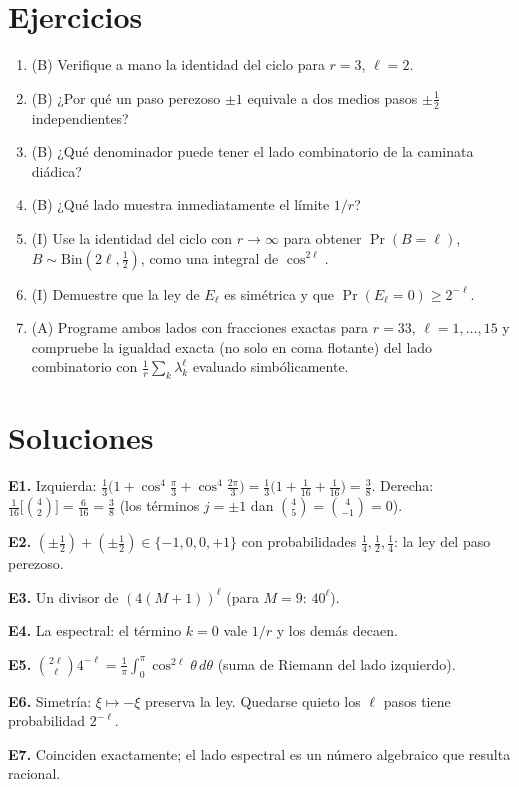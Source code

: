 \documentclass[11pt,a4paper]{article}
\begin{document}
\section{Ejercicios}
\begin{enumerate}[label=\textbf{E\arabic*.}]
\item (B) Verifique a mano la identidad del ciclo para $r=3$, $\ell=2$.
\item (B) ¿Por qué un paso perezoso $\pm1$ equivale a dos medios pasos $\pm\frac12$ independientes?
\item (B) ¿Qué denominador puede tener el lado combinatorio de la caminata diádica?
\item (B) ¿Qué lado muestra inmediatamente el límite $1/r$?
\item (I) Use la identidad del ciclo con $r\to\infty$ para obtener $\Pr(B=\ell)$, $B\sim\mathrm{Bin}(2\ell,\frac12)$, como una integral de $\cos^{2\ell}$.
\item (I) Demuestre que la ley de $E_\ell$ es simétrica y que $\Pr(E_\ell=0)\ge2^{-\ell}$.
\item (A) Programe ambos lados con fracciones exactas para $r=33$, $\ell=1,\dots,15$ y compruebe la igualdad exacta (no solo en coma flotante) del lado combinatorio con $\frac1r\sum_k\lambda_k^\ell$ evaluado simbólicamente.
\end{enumerate}
\section{Soluciones}
\begin{solucion}
\textbf{E1.} Izquierda: $\frac13\big(1+\cos^4\frac\pi3+\cos^4\frac{2\pi}3\big)=\frac13\big(1+\frac1{16}+\frac1{16}\big)=\frac38$. Derecha: $\frac1{16}\big[\binom42\big]=\frac6{16}=\frac38$
(los términos $j=\pm1$ dan $\binom4{5}=\binom4{-1}=0$).

\textbf{E2.} $(\pm\frac12)+(\pm\frac12)\in\{-1,0,0,+1\}$ con probabilidades $\frac14,\frac12,\frac14$: la ley del paso perezoso.

\textbf{E3.} Un divisor de $(4(M+1))^\ell$ (para $M=9$: $40^\ell$).

\textbf{E4.} La espectral: el término $k=0$ vale $1/r$ y los demás decaen.

\textbf{E5.} $\binom{2\ell}\ell4^{-\ell}=\frac1\pi\int_0^\pi\cos^{2\ell}\theta\,d\theta$ (suma de Riemann del lado izquierdo).

\textbf{E6.} Simetría: $\xi\mapsto-\xi$ preserva la ley. Quedarse quieto los $\ell$ pasos tiene probabilidad $2^{-\ell}$.

\textbf{E7.} Coinciden exactamente; el lado espectral es un número algebraico que resulta racional.
\end{solucion}
\end{document}
